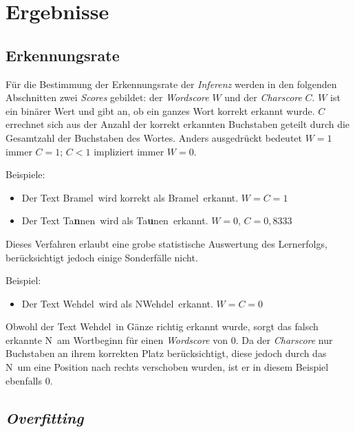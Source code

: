 \section{Ergebnisse}
\label{ergebnisse}

\subsection{Erkennungsrate}
\label{ergebnisse:erfolg}

Für die Bestimmung der Erkennungsrate der \textit{Inferenz} werden in den folgenden Abschnitten zwei \textit{Scores}
gebildet: der \textit{Wordscore} $W$ und der \textit{Charscore} $C$. $W$ ist ein binärer Wert und gibt an, ob ein ganzes
Wort korrekt erkannt wurde. $C$ errechnet sich aus der Anzahl der korrekt erkannten Buchstaben geteilt durch die
Gesamtzahl der Buchstaben des Wortes. Anders ausgedrückt bedeutet $W = 1$ immer $C = 1$; $C < 1$ impliziert immer
$W = 0$.

Beispiele:

\begin{itemize}
    \item Der Text \glqq Bramel\grqq\ wird korrekt als \glqq Bramel\grqq\ erkannt. $W = C = 1$
    \item Der Text \glqq Ta\textbf{\color{red}n}nen\grqq\ wird als \glqq Ta\textbf{\color{red}u}nen\grqq\ erkannt.
          $W = 0$, $C = 0,8333$
\end{itemize}

Dieses Verfahren erlaubt eine grobe statistische Auswertung des Lernerfolgs, berücksichtigt jedoch einige Sonderfälle
nicht.

Beispiel:

\begin{itemize}
    \item Der Text \glqq Wehdel\grqq\ wird als \glqq NWehdel\grqq\ erkannt. $W = C = 0$
\end{itemize}

Obwohl der Text \glqq Wehdel\grqq\ in Gänze richtig erkannt wurde, sorgt das falsch erkannte \glqq N\grqq\ am
Wortbeginn für einen \textit{Wordscore} von 0. Da der \textit{Charscore} nur Buchstaben an ihrem korrekten Platz
berücksichtigt, diese jedoch durch das \glqq N\grqq\ um eine Position nach rechts verschoben wurden, ist er in diesem
Beispiel ebenfalls 0.

\subsection{\textit{Overfitting}}
\label{ergebnisse:overfitting}

